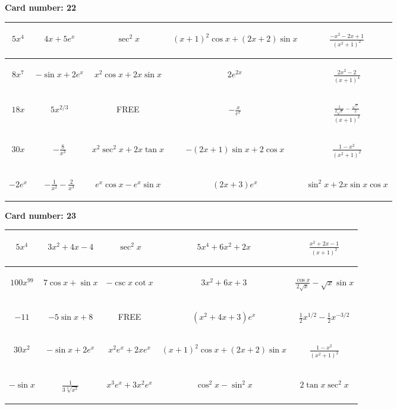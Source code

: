 \documentclass{article}
\newcommand{\entry}[1]{\begin{minipage}[t][2.75cm][t]{4cm} \vspace{1cm} \begin{center}#1\end{center} \end{minipage}}
\newcommand{\freespace}{\entry{FREE}}
\newcommand{\cardnumber}[1]{\noindent \textbf{Card number: #1} \bigskip}
\begin{document}
\pagebreak

\cardnumber{22}
\begin{center}
\begin{tabular}{|*{5}{c|}}
    \hline
    \entry{$5x^4$} & \entry{$4x + 5e^x$} & \entry{$\sec^2 x$} & \entry{$(x + 1)^2 \cos x + (2x + 2) \sin x$} & \entry{$\frac{-x^2 - 2x + 1}{(x^2 + 1)^2}$} \\ \hline
    \entry{$8x^7$} & \entry{$-\sin x + 2e^x$} & \entry{$x^2 \cos x + 2x \sin x$} & \entry{$2e^{2x}$} & \entry{$\frac{2x^2 - 2}{(x + 1)^4}$} \\ \hline
    \entry{$18x$} & \entry{$5x^{2/3}$} & \freespace & \entry{$-\frac{x}{e^x}$} & \entry{$\frac{\frac{1}{2 \sqrt{x}} - \frac{\sqrt{x}}{2}}{(x + 1)^2}$} \\ \hline
    \entry{$30x$} & \entry{$-\frac{8}{x^3}$} & \entry{$x^2 \sec^2 x + 2x \tan x$} & \entry{$-(2x + 1) \sin x + 2 \cos x$} & \entry{$\frac{1 - x^2}{(x^2 + 1)^2}$} \\ \hline
    \entry{$-2e^x$} & \entry{$-\frac{1}{x^2} - \frac{2}{x^3}$} & \entry{$e^x \cos x - e^x \sin x$} & \entry{$(2x + 3) e^x$} & \entry{$\sin^2 x + 2x \sin x \cos x$} \\ \hline
\end{tabular}
\end{center}

\pagebreak

\cardnumber{23}
\begin{center}
\begin{tabular}{|*{5}{c|}}
    \hline
    \entry{$5x^4$} & \entry{$3x^2 + 4x - 4$} & \entry{$\sec^2 x$} & \entry{$5x^4 + 6x^2 + 2x$} & \entry{$\frac{x^2 + 2x - 1}{(x + 1)^2}$} \\ \hline
    \entry{$100x^{99}$} & \entry{$7 \cos x + \sin x$} & \entry{$-\csc x \cot x$} & \entry{$3x^2 + 6x + 3$} & \entry{$\frac{\cos x}{2 \sqrt{x}} - \sqrt{x} \sin x$} \\ \hline
    \entry{$-11$} & \entry{$-5 \sin x + 8$} & \freespace & \entry{$(x^2 + 4x + 3) e^x$} & \entry{$\frac{1}{2} x^{1/2} - \frac{1}{2} x^{-3/2}$} \\ \hline
    \entry{$30x^2$} & \entry{$-\sin x + 2e^x$} & \entry{$x^2 e^x + 2x e^x$} & \entry{$(x + 1)^2 \cos x + (2x + 2) \sin x$} & \entry{$\frac{1 - x^2}{(x^2 + 1)^2}$} \\ \hline
    \entry{$-\sin x$} & \entry{$\frac{1}{3\sqrt[3]{x^2}}$} & \entry{$x^3 e^x + 3x^2 e^x$} & \entry{$\cos^2 x - \sin^2 x$} & \entry{$2 \tan x \sec^2 x$} \\ \hline
\end{tabular}
\end{center}
\end{document}
